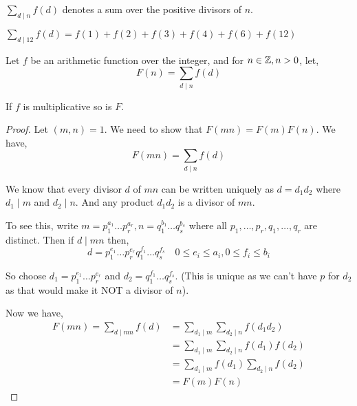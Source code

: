 \vspace{1em}

\hline
\vspace{1em}
\begin{definition}
$\sum_{d \mid n} f(d)$ denotes a sum over the positive divisors of $n$.
\end{definition}

\begin{eg}
	$\sum_{d \mid 12} f(d) = f(1) + f(2) + f(3) + f(4) +  f(6) + f(12)$
\end{eg}

\begin{theorem}
	Let $f$ be an arithmetic function over the integer, and for $n \in \mathbb{Z}, n > 0$, let, 
	$$
		F(n) = \sum_{d \mid n} f(d)
	$$

	If $f$ is multiplicative so is $F$.
\end{theorem}
\begin{proof}
	Let $(m,n) = 1$. We need to show that $F(mn) = F(m)F(n)$. We have, $$
		F(mn) = \sum_{d \mid n} f(d)
	$$

	We know that every divisor $d$ of $mn$	 can be written uniquely as $d = d_{1} d_{2}$ where $d_{1} \mid m$ and $d_{2} \mid n$. And any product $d_{1}d_{2}$ is a divisor of $mn$.

	\vspace{1em}
	
	To see this, write $m = p_{1}^{a_{1}} \dots p_r^{a_r}, n= q_{1}^{b_{1}} \dots q_s^{b_s}$ where all $p_{1},\dots, p_r, q_{1}, \dots, q_r$ are distinct. Then if $d \mid mn$ then, 
	$$ d = p_{1}^{e_{1}} \dots p_r^{e_r} q_{1}^{f_{1}} \dots q_s^{f_s} \quad 0 \le e_i \le a_i, 0 \le f_i \le b_i $$
	

	So choose $d_{1} =p_{1}^{e_{1}} \dots p_r^{e_r} $ and $d_{2} = q_{1}^{f_{1}} \dots q_s^{f_s}$. (This is unique as we can't have $p$ for $d_{2}$ as that would make it NOT a divisor of $n$).

	\vspace{1em}
	
	Now we have,
	\begin{align*}
		F(mn) = \sum_{d \mid mn} f(d) &= \sum_{d_{1} \mid m} \sum_{d_{2} \mid n} f(d_{1}d_{2})\\
					      &=  \sum_{d_{1} \mid m} \sum_{d_{2} \mid n} f(d_{1}) f(d_{2})\\
					      &=  \sum_{d_{1} \mid m} f(d_{1}) \sum_{d_{2} \mid n} f(d_{2})\\
					      &= F(m)F(n)
	\end{align*}
\end{proof}

